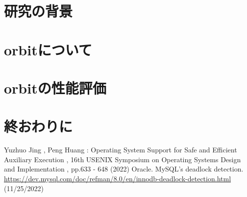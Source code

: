 \documentclass[submit,techreq,noauthor]{eco}	%
\begin{document}
\section{研究の背景}


\section{orbitについて}


\section{orbitの性能評価}


\section{終おわりに}



\begin{thebibliography}{99}
   Yuzhuo Jing , Peng Huang : Operating System 
  Support for Safe and Efficient Auxiliary Execution , 16th 
  USENIX Symposium on Operating Systems Design and Implementation ,
   pp.633 - 648 (2022)
   Oracle. MySQL's deadlock detection.\\
  \url{https://dev.mysql.com/doc/refman/8.0/en/innodb-deadlock-detection.html}
  (11/25/2022)
\end{thebibliography}
\end{document}
